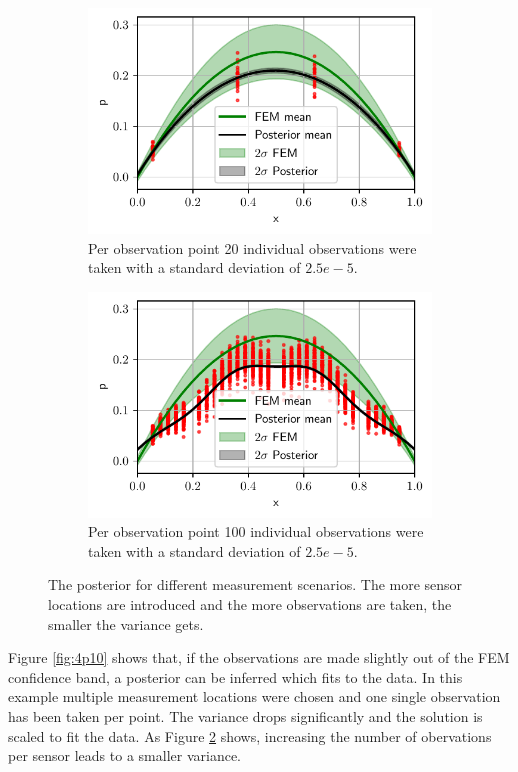 \documentclass[%
  a4paper,oneside,%
  11pt,%
  smallchapters,
  style=printdev,
  extramargin,
  green,%
  rgb, <cmyk>
  ]{tubsbook}
\begin{document}
\begin{figure}[!ht]
	\begin{subfigure}[t]{.5\textwidth}
	\centering
	\includegraphics[width=1\linewidth]{../../Python/Results/1D/Model_Error/20o_4s/Result.pdf}
	\caption{Per observation point 20 individual observations were taken with a standard deviation of $2.5e-5$. }	
	\label{fig:DataCloseToCI2}
	\end{subfigure}%
	\begin{subfigure}[t]{.5\textwidth}
	\centering
	\includegraphics[width=1\linewidth]{../../Python/Results/1D/Model_Error/100o_30s/Result.pdf}
	\caption{Per observation point 100 individual observations were taken with a standard deviation of $2.5e-5$. }	
	\label{fig:DataCloseToCI2}
	\end{subfigure}

\caption{The posterior for different measurement scenarios. The more sensor locations are introduced and the more observations are taken, the smaller the variance gets.}	
	
\label{fig:OneSensor}
\end{figure}
%
Figure \ref{fig:4p10} shows that, if the observations are made slightly out of the FEM confidence band, a posterior can be inferred which fits to the data. In this example multiple measurement locations were chosen and one single observation has been taken per point. The variance drops significantly and the solution is scaled to fit the data.
%
As Figure \ref{fig:DataCloseToCI2} shows, increasing the number of obervations per sensor leads to a smaller variance.
\end{document}
